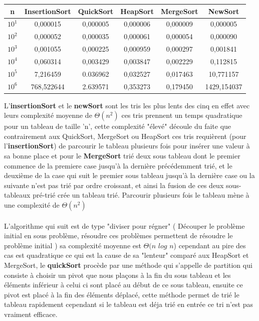 \documentclass[a4paper, 11pt, oneside]{article}
\begin{document}
\begin{table}[htb]
\begin{tabular}{cccccc}
\hline

n   & InsertionSort & QuickSort & HeapSort & MergeSort & NewSort \\ \hline
$10^{1}$ & 0,000015      & 0,000005  & 0,000006         & 0,000009          & 0,000005        \\
$10^{2}$ & 0,000052      & 0,000035  & 0,000061         & 0,000054          & 0,000090        \\
$10^{3}$ & 0,001055      & 0,000225  & 0,000959         & 0,000297          & 0,001841        \\
$10^{4}$ & 0,060314      & 0,003429  & 0,003847         & 0,002229          & 0,112815        \\
$10^{5}$ & 7,216459      & 0.036962  & 0,032527         & 0,017463           & 10,771157        \\
$10^{6}$ & 768,522644    & 2.639571  & 0,353273         & 0,179450          & 1429,154037
        
\end{tabular}
\end{table}

L'\textbf{insertionSort} et le \textbf{newSort} sont les tris les plus lents des cinq en effet avec leurs complexité moyenne de $\Theta(n^{2})$ ces tris prennent un temps quadratique pour un tableau de taille 'n', cette complexité "élevé" découle du faite que contrairement aux QuickSort, MergeSort ou HeapSort ces tris requièrent (pour l'\textbf{insertionSort}) de parcourir le tableau plusieurs fois pour insérer une valeur à sa bonne place et pour le \textbf{MergeSort} trié deux sous tableau dont le premier commence de la premiere case jusqu'à la dernière précédemment trié, et le deuxième de la case qui suit le premier sous tableau jusqu'à la dernière case ou la suivante  n'est pas trié par ordre croissant, et ainsi la fusion de ces deux sous-tableaux pré-trié crée un tableau trié.
 Parcourir plusieurs fois le tableau mène à une complexité de $\Theta(n^{2})$
\\
\\
L'algorithme qui suit est de type "diviser pour régner" ( Découper le problème initial en sous problème, résoudre ces problèmes permettent de résoudre le problème initial ) sa complexité moyenne est $\Theta(n$ $log$ $n$) cependant au pire des cas est quadratique ce qui est la cause de sa "lenteur" comparé aux HeapSort et MergeSort, le \textbf{quickSort} procède par une méthode qui s'appelle de partition qui consiste à choisir un pivot que nous plaçons à la fin du sous tableau et les éléments inférieur à celui ci sont placé au début de ce sous tableau, ensuite ce pivot est placé à la fin des éléments déplacé, cette méthode permet de trié le tableau rapidement cependant si le tableau est déja trié en entrée ce tri n'est pas vraiment efficace.\\ 
\end{document}
